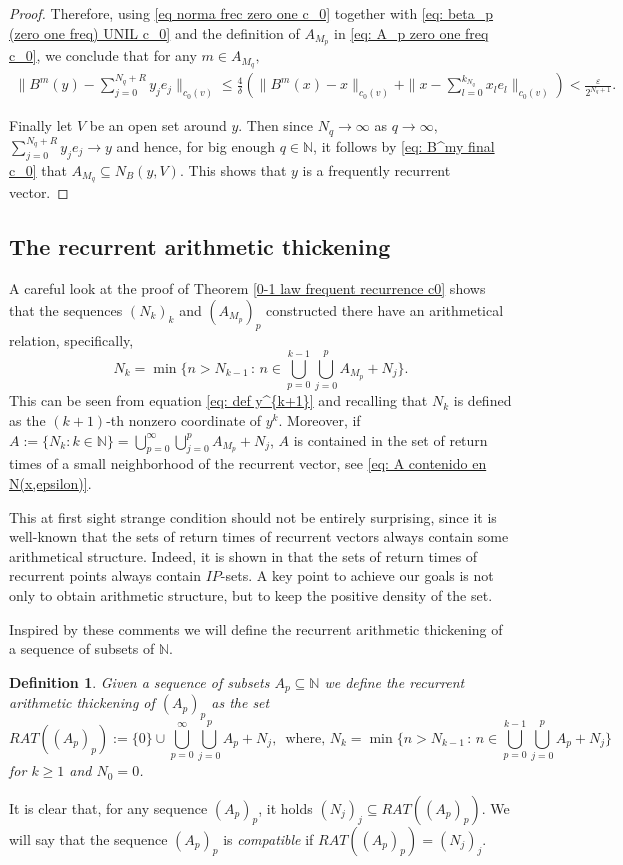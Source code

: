 \documentclass[11pt]{amsart}
\newtheorem{definition}[theorem]{Definition}
\newcommand{\zN}{\mathbb N}
\newcommand{\sub}{\subseteq}
\begin{document}
\begin{proof}
Therefore, using  \eqref{eq norma frec zero one c_0}  together with \eqref{eq: beta_p (zero one freq) UNIL c_0} and the definition of $A_{M_p}$ in \eqref{eq: A_p zero one freq c_0}, we conclude that for any $m\in A_{M_{q}},$
\begin{align}\label{eq: B^my final c_0}
\|B^m(y)-\sum_{j=0}^{N_{q}+R}y_je_j \|_{c_0(v)}\le \frac{4}{\delta}\left(\|B^m(x)-x\|_{{c_0(v)}}+\|x-\sum_{l=0}^{k_{N_{q}}}x_le_l\|_{{c_0(v)}}\right)< \frac{\varepsilon}{2^{N_{q}+1}}.
    \end{align}

 
Finally let $V$ be an open set around $y$. Then since  ${N_q}\to\infty$ as $q\to\infty,$    $\sum_{j=0}^{N_q+R} y_je_j\to y$ and hence,  for big enough  $q\in\mathbb N$, it follows by \eqref{eq: B^my final c_0} that $A_{M_{q}}\sub N_B(y,V).$
This shows that $y$ is a frequently recurrent vector.
\end{proof}


\subsection{The recurrent arithmetic thickening\label{section RAT}}
A careful look at the proof of Theorem \ref{0-1 law frequent recurrence c0} shows that the sequences $(N_k)_k$ and $(A_{M_p})_p$ constructed there have an arithmetical relation, specifically, 
$$
N_{k}=\min\{ n>N_{k-1}\,:\, n\in\bigcup_{p=0}^{k-1}\bigcup_{j=0}^p A_{M_p}+N_j\}.
$$
This can be seen from equation \eqref{eq: def y^{k+1}} and recalling that $N_{k}$ is defined as the $(k+1)$-th nonzero coordinate of $y^k$. 
Moreover, if $A:=\{N_k:k\in\zN\}=\bigcup_{p=0}^{\infty}\bigcup_{j=0}^p A_{M_p}+N_j$, $A$ is contained in the set of return times of a small neighborhood of the recurrent vector, see \eqref{eq: A contenido en N(x,epsilon)}.

This at first sight strange condition should not be entirely surprising, since it is well-known that the sets of return times of recurrent vectors always contain some arithmetical structure. Indeed, it is shown in \cite[Theorem 2.17]{Fur81} that the sets of return times of recurrent points always contain $IP$-sets. A key point to achieve our goals is not only to obtain arithmetic structure, but to keep the  positive density of the set. 

Inspired by these comments we will define the recurrent arithmetic thickening of a sequence of subsets of $\zN$. 
\begin{definition}
    Given a sequence of subsets $A_p\sub \zN$ we define the recurrent arithmetic thickening of $(A_p)_p$ as the set
    \begin{equation}\label{RAT(A_p)}
    RAT((A_p)_p):=\{0\}\cup\bigcup_{p=0}^\infty\bigcup_{j=0}^p A_{p}+N_j ,\, \text{ where, }N_k=\min\{ n>N_{k-1}\,:\, n\in\bigcup_{p=0}^{k-1}\bigcup_{j=0}^p A_{p}+N_j\}
       \end{equation}
     for $k\ge1$ and $N_0=0$.
     \end{definition}
It is clear that, for any sequence $(A_p)_p$, it holds $(N_j)_j\sub RAT((A_p)_p)$. We will say that the sequence $(A_p)_p$ is \emph{compatible} if $RAT((A_p)_p)=(N_j)_j$.
\end{document}
